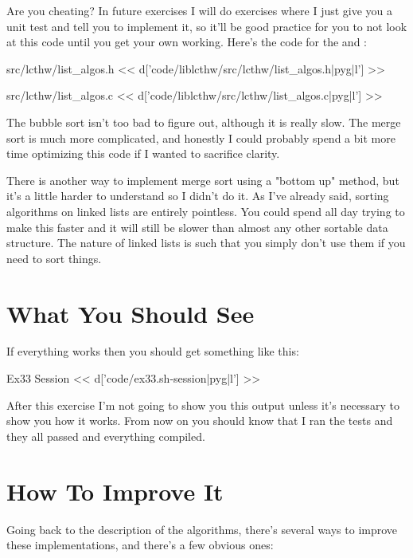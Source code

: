 Are you cheating?  In future exercises I will do exercises where I just give
you a unit test and tell you to implement it, so it'll be good practice for you
to not look at this code until you get your own working.  Here's the code for
the  and :

\begin{code}{src/lcthw/list\_algos.h}
<< d['code/liblcthw/src/lcthw/list_algos.h|pyg|l'] >>
\end{code}

\begin{code}{src/lcthw/list\_algos.c}
<< d['code/liblcthw/src/lcthw/list_algos.c|pyg|l'] >>
\end{code}

The bubble sort isn't too bad to figure out, although it is really slow.  The
merge sort is much more complicated, and honestly I could probably spend a bit
more time optimizing this code if I wanted to sacrifice clarity.

There is another way to implement merge sort using a "bottom up" method, but 
it's a little harder to understand so I didn't do it.  As I've already said,
sorting algorithms on linked lists are entirely pointless.  You could spend
all day trying to make this faster and it will still be slower than almost
any other sortable data structure.  The nature of linked lists is such that
you simply don't use them if you need to sort things.

\section{What You Should See}

If everything works then you should get something like this:

\begin{code}{Ex33 Session}
<< d['code/ex33.sh-session|pyg|l'] >>
\end{code}

After this exercise I'm not going to show you this output unless it's necessary
to show you how it works.  From now on you should know that I ran the tests and
they all passed and everything compiled.

\section{How To Improve It}

Going back to the description of the algorithms, there's several ways to
improve these implementations, and there's a few obvious ones:

